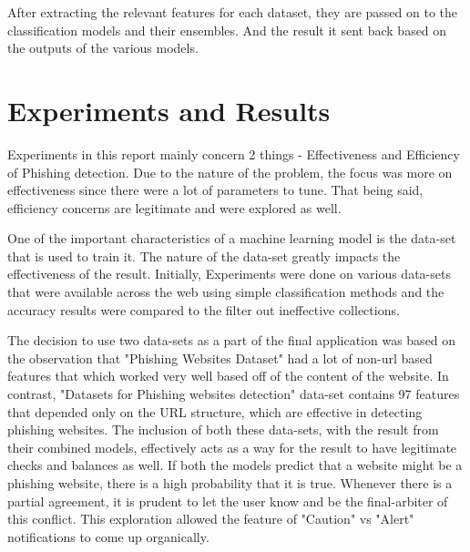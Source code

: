 \documentclass[conference]{IEEEtran}
\begin{document}
\par After extracting the relevant features for each dataset, they are passed on to the classification models and their ensembles. And the result it sent back based on the outputs of the various models.

\section{Experiments and Results}

Experiments in this report mainly concern 2 things - Effectiveness and Efficiency of Phishing detection. Due to the nature of the problem, the focus was more on effectiveness since there were a lot of parameters to tune. That being said, efficiency concerns are legitimate and were explored as well.

\par One of the important characteristics of a machine learning model is the data-set that is used to train it. The nature of the data-set greatly impacts the effectiveness of the result. Initially, Experiments were done on various data-sets that were available across the web using simple classification methods and the accuracy results were compared to the filter out ineffective collections. 

\par The decision to use two data-sets as a part of the final application was based on the observation that "Phishing Websites Dataset" had a lot of non-url based features that which worked very well based off of the content of the website. In contrast, "Datasets for Phishing websites detection" data-set contains 97 features that depended only on the URL structure, which are effective in detecting phishing websites. The inclusion of both these data-sets, with the result from their combined models, effectively acts as a way for the result to have legitimate checks and balances as well. If both the models predict that a website might be a phishing website, there is a high probability that it is true. Whenever there is a partial agreement, it is prudent to let the user know and be the final-arbiter of this conflict. This exploration allowed the feature of "Caution" vs "Alert" notifications to come up organically.
\end{document}
